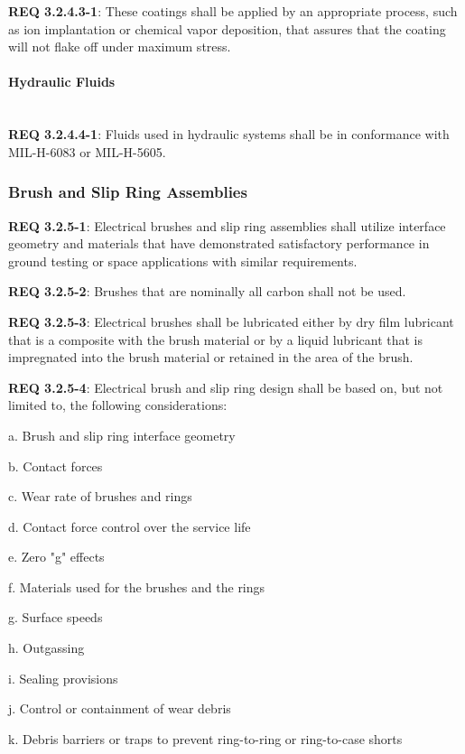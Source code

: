 \documentclass[12pt]{article}
\begin{document}
\noindent \textbf{REQ 3.2.4.3-1}: These coatings shall be applied by an appropriate process, such as ion implantation or chemical vapor deposition, that assures that the coating will not flake off under maximum stress.


\paragraph{Hydraulic Fluids} \mbox{} \\ %
\noindent \textbf{REQ 3.2.4.4-1}: Fluids used in hydraulic systems shall be in conformance with MIL-H-6083 or MIL-H-5605.


\clearpage
\subsubsection{Brush and Slip Ring Assemblies} %
\noindent \textbf{REQ 3.2.5-1}: Electrical brushes and slip ring assemblies shall utilize interface geometry and materials that have demonstrated satisfactory performance in ground testing or space applications with similar requirements.

\noindent \textbf{REQ 3.2.5-2}: Brushes that are nominally all carbon shall not be used.

\noindent \textbf{REQ 3.2.5-3}: Electrical brushes shall be lubricated either by dry film lubricant that is a composite with the brush material or by a liquid lubricant that is impregnated into the brush material or retained in the area of the brush. 

\noindent \textbf{REQ 3.2.5-4}: Electrical brush and slip ring design shall be based on, but not limited to, the following considerations:

a. Brush and slip ring interface geometry

b. Contact forces

c. Wear rate of brushes and rings

d. Contact force control over the service life

e. Zero "g" effects

f. Materials used for the brushes and the rings

g. Surface speeds

h. Outgassing

i. Sealing provisions

j. Control or containment of wear debris

k. Debris barriers or traps to prevent ring-to-ring or ring-to-case shorts
\end{document}
